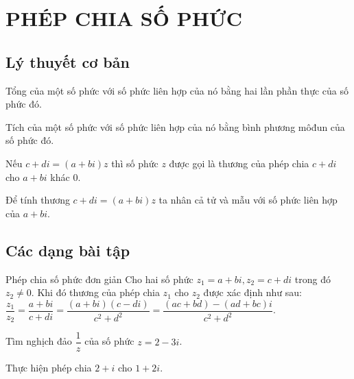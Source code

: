 \section{PHÉP CHIA SỐ PHỨC}
\subsection{Lý thuyết cơ bản}
\begin{tc}
	Tổng của một số phức với số phức liên hợp của nó bằng hai lần phần thực của số phức đó.
\end{tc}

\begin{tc}
	Tích của một số phức với số phức liên hợp của nó bằng bình phương môđun của số phức đó.
\end{tc}

\begin{dn}
	Nếu $c+di=(a+bi)z$ thì số phức $z$ được gọi là thương của phép chia $c+di$ cho $a+bi$  khác $0$.
\end{dn}

\begin{note}
	Để tính thương $c+di=(a+bi)z$ ta nhân cả tử và mẫu với số phức liên hợp của $a+bi$.
\end{note}

\subsection{Các dạng bài tập}
\begin{dang}
	{Phép chia số phức đơn giản}
	Cho hai số phức $z_1=a+bi, z_2=c+di$ trong đó $z_2 \neq 0$. Khi đó thương của phép chia $z_1$ cho $z_2$ được xác định như sau:\\
	$\dfrac{z_1}{z_2} = \dfrac{a+bi}{c+di} = \dfrac{(a+bi)(c-di)}{c^2+d^2} = \dfrac{(ac+bd)-(ad+bc)i}{c^2+d^2}$.
\end{dang}

\begin{vd}%
	Tìm nghịch đảo $\dfrac{1}{z}$ của số phức $z=2-3i$.
\end{vd}

\begin{vd}%
	Thực hiện phép chia $2+i$ cho $1+2i$.
\end{vd}

